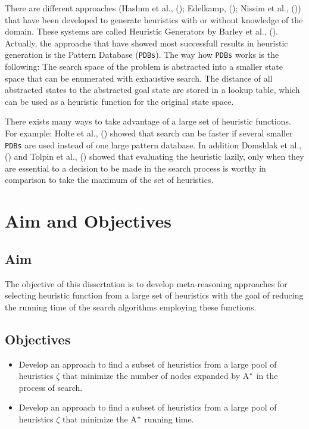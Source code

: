 There are different approaches (Haslum et al., (\citeyear{haslum2007domain}); Edelkamp, (\citeyear{edelkamp2007automated}); Nissim et al., (\citeyear{nissim2011computing})) that have been developed to generate heuristics with or without knowledge of the domain. These systems are called Heuristic Generators by Barley et al., (\citeyear{BarleySantiagoOver}). Actually, the approache that have showed most successfull results in heuristic generation is the Pattern Database (\texttt{PDBs}). The way how \texttt{PDBs} works is the following: The search space of the problem is abstracted into a smaller state space that can be enumerated with exhaustive search. The distance of all abstracted states to the abstracted goal state are stored in a lookup table, which can be used as a heuristic function for the original state space.

There exists many ways to take advantage of a large set of heuristic functions. For example: Holte et al., (\citeyear{holte2006maximizing}) showed that search can be faster if several smaller \texttt{PDBs} are used instead of one large pattern database. In addition Domshlak et al., (\citeyear{domshlak2010max}) and Tolpin et al.,  (\citeyear{tolpin2013towards}) showed that evaluating the heuristic lazily, only when they are essential to a decision to be made in the search process is worthy in comparison to take the maximum of the set of heuristics.
\section{Aim and Objectives}
\subsection{Aim}
\noindent
The objective of this dissertation is to develop meta-reasoning approaches for selecting heuristic function from a large set of heuristics with the goal of reducing the running time of the search algorithms employing these functions.

\subsection{Objectives}
\noindent

\begin{itemize}
  \item Develop an approach to find a subset of heuristics from a large pool of heuristics $\zeta$ that minimize the number of nodes expanded by A$\sp{*}$ in the process of search.
  
  \item Develop an approach to find a subset of heuristics from a large pool of heuristics $\zeta$ that minimize the A$\sp{*}$ running time.

\end{itemize}
